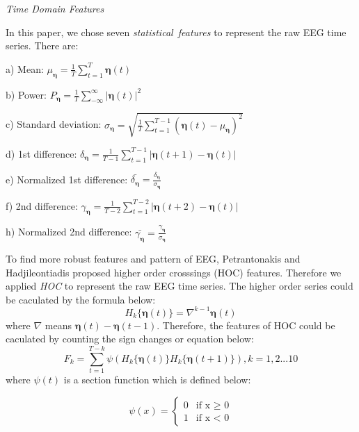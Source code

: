 \documentclass[runningheads,a4paper]{llncs}
\begin{document}
\emph{Time Domain Features}

In this paper, we chose seven \emph{statistical\ features} to represent the
raw EEG time series. There are:

a) Mean: ${\mu}_{\bm{\eta}} = \frac{1}{T}\sum_{t=1}^T \bm{\eta}(t)$

b) Power: $P_{\bm{\eta}} = \frac{1}{T}\sum_{-\infty}^{\infty} |{\bm{\eta}}(t)|^2 $

c) Standard deviation: $\sigma_{\bm{\eta}} = \sqrt{ \frac{1}{T} \sum_{t=1}^{T-1} ({\bm{\eta}}(t) - {\mu}_{\bm{\eta}})^2 }$

d) 1st difference: $\delta_{\bm{\eta}} = \frac{1}{T-1}\sum_{t=1}^{T-1}|{\bm{\eta}}(t+1) - {\bm{\eta}}(t)|$

e) Normalized 1st difference: $ \bar{\delta_{\bm{\eta}}} = \frac{ \delta_{\bm{\eta}}}{\sigma_{\bm{\eta}}}$

f) 2nd difference: $\gamma_{\bm{\eta}} = \frac{1}{T-2}\sum_{t=1}^{T-2}|{\bm{\eta}}(t+2) - {\bm{\eta}}(t)|$

h) Normalized 2nd difference: $\bar{\gamma_{\bm{\eta}}} = \frac{\gamma_{\bm{\eta}}}{\sigma_{\bm{\eta}}}$

To find more robust features and pattern of EEG, Petrantonakis and Hadjileontiadis proposed
 higher order crosssings (HOC) features\cite{HOC}. Therefore we applied \emph{HOC} to represent the raw EEG time series.
The higher order series could be caculated by the formula below:
\begin{equation}
    H_k\{{\bm{\eta}}(t)\} = \nabla^{k-1}{\bm{\eta}}(t)
\end{equation}
where $\nabla$ means ${\bm{\eta}}(t) - {\bm{\eta}}(t-1)$. Therefore, the features
of HOC could be caculated by counting the sign changes or equation below:
\begin{equation}
  F_k = \sum_{t=1}^{T-k}\psi(H_k\{{\bm{\eta}}(t)\}H_k\{{\bm{\eta}}(t+1)\}), k = 1,2...10
\end{equation}
where $\psi(t)$ is a section function which is defined below:

\begin{equation}
   \psi(x)=
   \begin{cases}
   0 &\mbox{if x $\geq$ 0}\\
   1 &\mbox{if  x $<$ 0}
   \end{cases}
\end{equation}
\end{document}
